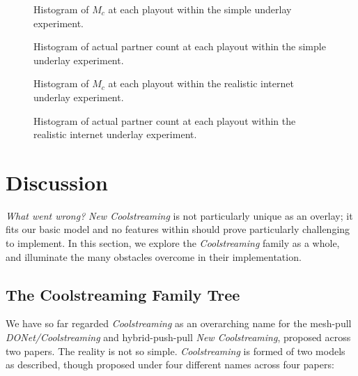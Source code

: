 \documentclass[12pt,a4paper]{article}
\begin{document}
\begin{figure}[!ht]
	\centering
	\resizebox{0.7\textwidth}{!}{%
		
	}%
	\caption{Histogram of \(M_c\) at each playout within the simple underlay experiment.}
	\label{simple_mc_count}
\end{figure}

\begin{figure}[!ht]
	\centering
	\resizebox{0.7\textwidth}{!}{%
		
	}%
	\caption{Histogram of actual partner count at each playout within the simple underlay experiment.}
	\label{simple_partner_count}
\end{figure}

\begin{figure}[!ht]
	\centering
	\resizebox{0.7\textwidth}{!}{%
		
	}%
	\caption{Histogram of \(M_c\) at each playout within the realistic internet underlay experiment.}
	\label{inet_mc_count}
\end{figure}

\begin{figure}[!ht]
	\centering
	\resizebox{0.7\textwidth}{!}{%
		
	}%
	\caption{Histogram of actual partner count at each playout within the realistic internet underlay experiment.}
	\label{inet_partner_count}
\end{figure}

\clearpage
\section{Discussion} \label{problems}
\textit{What went wrong?} \textit{New Coolstreaming} is not particularly unique as an overlay; it fits our basic model and no features within should prove particularly challenging to implement. In this section, we explore the \textit{Coolstreaming} family as a whole, and illuminate the many obstacles overcome in their implementation.

\subsection{The Coolstreaming Family Tree} \label{problems:familytree}
We have so far regarded \textit{Coolstreaming} as an overarching name for the mesh-pull \textit{DONet/Coolstreaming} and hybrid-push-pull \textit{New Coolstreaming}, proposed across two papers. The reality is not so simple. \textit{Coolstreaming} is formed of two models as described, though proposed under four different names across four papers:
\end{document}
